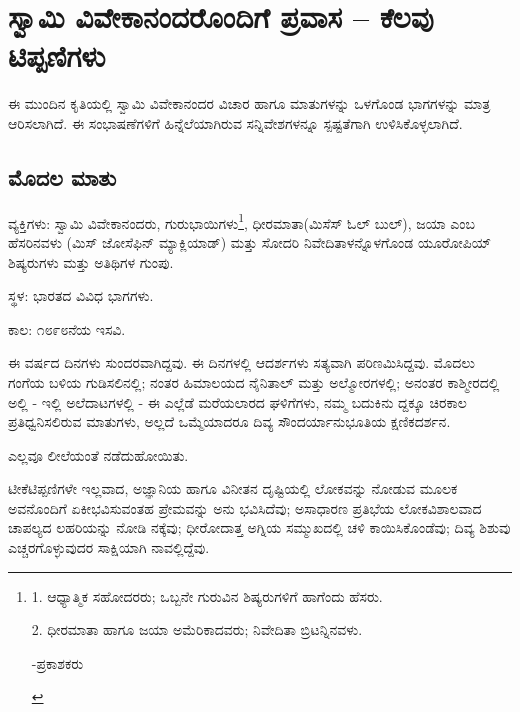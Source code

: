 


\part{ಸ್ವಾಮಿ ವಿವೇಕಾನಂದರೊಂದಿಗೆ ಪ್ರವಾಸ – ಕೆಲವು ಟಿಪ್ಪಣಿಗಳು}



ಈ ಮುಂದಿನ ಕೃತಿಯಲ್ಲಿ ಸ್ವಾಮಿ ವಿವೇಕಾನಂದರ ವಿಚಾರ ಹಾಗೂ ಮಾತುಗಳನ್ನು ಒಳಗೊಂಡ ಭಾಗಗಳನ್ನು ಮಾತ್ರ ಆರಿಸಲಾಗಿದೆ. ಈ ಸಂಭಾಷಣೆಗಳಿಗೆ ಹಿನ್ನೆಲೆಯಾಗಿರುವ ಸನ್ನಿವೇಶಗಳನ್ನೂ ಸ್ಪಷ್ಟತೆಗಾಗಿ ಉಳಿಸಿಕೊಳ್ಳಲಾಗಿದೆ.

\chapter{ಮೊದಲ ಮಾತು}

ವ್ಯಕ್ತಿಗಳು: ಸ್ವಾಮಿ ವಿವೇಕಾನಂದರು, ಗುರುಭಾಯಿಗಳು\footnote{1. ಆಧ್ಯಾತ್ಮಿಕ ಸಹೋದರರು; ಒಬ್ಬನೇ ಗುರುವಿನ ಶಿಷ್ಯರುಗಳಿಗೆ ಹಾಗೆಂದು ಹೆಸರು.

2. ಧೀರಮಾತಾ ಹಾಗೂ ಜಯಾ ಅಮೆರಿಕಾದವರು; ನಿವೇದಿತಾ ಬ್ರಿಟನ್ನಿನವಳು.

\begin{flushright}
-ಪ್ರಕಾಶಕರು
\end{flushright}}, ಧೀರಮಾತಾ(ಮಿಸೆಸ್ ಓಲ್ ಬುಲ್), ಜಯಾ ಎಂಬ ಹೆಸರಿನವಳು (ಮಿಸ್ ಜೋಸೆಫಿನ್ ಮ್ಯಾಕ್ಲಿಯಾಡ್) ಮತ್ತು ಸೋದರಿ ನಿವೇದಿತಾಳನ್ನೊಳಗೊಂಡ ಯೂರೋಪಿಯ್​ ಶಿಷ್ಯರುಗಳು ಮತ್ತು ಅತಿಥಿಗಳ ಗುಂಪು.

ಸ್ಥಳ: ಭಾರತದ ವಿವಿಧ ಭಾಗಗಳು.

ಕಾಲ: ೧೮೯೮ನೆಯ ಇಸವಿ.

ಈ ವರ್ಷದ ದಿನಗಳು ಸುಂದರವಾಗಿದ್ದವು. ಈ ದಿನಗಳಲ್ಲಿ ಆದರ್ಶಗಳು ಸತ್ಯವಾಗಿ ಪರಿಣಮಿಸಿದ್ದವು. ಮೊದಲು ಗಂಗೆಯ ಬಳಿಯ ಗುಡಿಸಲಿನಲ್ಲಿ; ನಂತರ ಹಿಮಾಲಯದ ನೈನಿತಾಲ್ ಮತ್ತು ಅಲ್ಮೋರಗಳಲ್ಲಿ; ಅನಂತರ ಕಾಶ್ಮೀರದಲ್ಲಿ ಅಲ್ಲಿ - ಇಲ್ಲಿ ಅಲೆದಾಟಗಳಲ್ಲಿ - ಈ ಎಲ್ಲೆಡೆ ಮರೆಯಲಾರದ ಘಳಿಗೆಗಳು, ನಮ್ಮ ಬದುಕಿನು ದ್ದಕ್ಕೂ ಚಿರಕಾಲ ಪ್ರತಿಧ್ವನಿಸಲಿರುವ ಮಾತುಗಳು, ಅಲ್ಲದೆ ಒಮ್ಮೆಯಾದರೂ ದಿವ್ಯ ಸೌಂದರ್ಯಾನುಭೂತಿಯ ಕ್ಷಣಿಕದರ್ಶನ.

ಎಲ್ಲವೂ ಲೀಲೆಯಂತೆ ನಡೆದುಹೋಯಿತು.

ಟೀಕೆಟಿಪ್ಪಣಿಗಳೇ ಇಲ್ಲವಾದ, ಅಜ್ಞಾನಿಯ ಹಾಗೂ ವಿನೀತನ ದೃಷ್ಟಿಯಲ್ಲಿ ಲೋಕವನ್ನು ನೋಡುವ ಮೂಲಕ ಅವನೊಂದಿಗೆ ಏಕೀಭವಿಸುವಂತಹ ಪ್ರೇಮವನ್ನು ಅನು ಭವಿಸಿದೆವು; ಅಸಾಧಾರಣ ಪ್ರತಿಭೆಯ ಲೋಕವಿಶಾಲವಾದ ಚಾಪಲ್ಯದ ಲಹರಿಯನ್ನು ನೋಡಿ ನಕ್ಕೆವು; ಧೀರೋದಾತ್ತ ಅಗ್ನಿಯ ಸಮ್ಮುಖದಲ್ಲಿ ಚಳಿ ಕಾಯಿಸಿಕೊಂಡೆವು; ದಿವ್ಯ ಶಿಶುವು ಎಚ್ಚರಗೊಳ್ಳುವುದರ ಸಾಕ್ಷಿಯಾಗಿ ನಾವಲ್ಲಿದ್ದೆವು.

